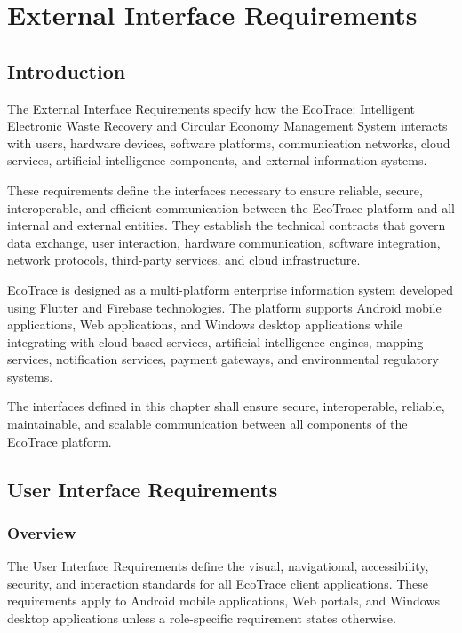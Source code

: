  
\chapter{External Interface Requirements}

\section{Introduction}

The External Interface Requirements specify how the EcoTrace:
Intelligent Electronic Waste Recovery and Circular Economy Management
System interacts with users, hardware devices, software platforms,
communication networks, cloud services, artificial intelligence
components, and external information systems.

These requirements define the interfaces necessary to ensure reliable,
secure, interoperable, and efficient communication between the EcoTrace
platform and all internal and external entities. They establish the
technical contracts that govern data exchange, user interaction,
hardware communication, software integration, network protocols,
third-party services, and cloud infrastructure.

EcoTrace is designed as a multi-platform enterprise information system
developed using Flutter and Firebase technologies. The platform supports
Android mobile applications, Web applications, and Windows desktop
applications while integrating with cloud-based services,
artificial intelligence engines, mapping services, notification
services, payment gateways, and environmental regulatory systems.

The interfaces defined in this chapter shall ensure secure,
interoperable, reliable, maintainable, and scalable communication
between all components of the EcoTrace platform.

\section{User Interface Requirements}

\subsection{Overview}

The User Interface Requirements define the visual, navigational, accessibility, security, and interaction standards for all EcoTrace client applications. These requirements apply to Android mobile applications, Web portals, and Windows desktop applications unless a role-specific requirement states otherwise.


